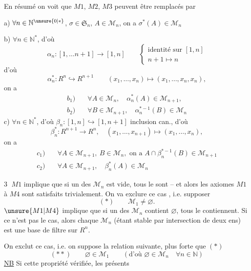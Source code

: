 En résumé on voit que $M1$, $M2$, $M3$ peuvent être remplacés par

a)  $\forall n\in\mathbb N^{\unsure{0|*}}$, $\sigma\in\mathfrak S_n$, $A\in\mathcal M_n$, on a $\sigma^*(A)\in\mathcal M_n$

b) $\forall n\in\mathbb N^*$, d'où
\[
\alpha_n:[1,\ldots n+1]\longrightarrow[1,n]\qquad
\left\{\begin{gathered}\text{identité sur }[1,n]\\ n+1\longmapsto n\end{gathered}\right.
\]
d'où 
\[
\alpha_n^*:R^n\hookrightarrow R^{n+1}\qquad(x_1,\ldots,x_n)\longmapsto(x_1,\ldots,x_n,x_n),
\]
on a
\[
\begin{aligned}
b_1)\quad&\forall A\in\mathcal M_n,\quad\alpha_n^*(A)\in\mathcal M_{n+1},\\
b_2)\quad&\forall B\in\mathcal M_{n+1},\quad\alpha_n^{*-1}(B)\in\mathcal M_n
\end{aligned}
\]
c) $\forall n\in\mathbb N^*$, d'où $\beta_n:[1,n]\hookrightarrow[1,n+1]$ inclusion can., d'où
\[
\beta_n^*:R^{n+1}\longrightarrow R^n,\quad(x_1,\ldots,x_{n+1})\longmapsto(x_1,\ldots,x_n),
\]
on a
\[
\begin{aligned}
c_1)\quad&\forall A\in\mathcal M_{n+1},\ B\in\mathcal M_n,\text{ on a }A\cap\beta_n^{*-1}(B)\in\mathcal M_{n+1}\\
c_2)\quad&\forall A\in\mathcal M_{n+1},\quad\beta_n^*(A)\in\mathcal M_n
\end{aligned}
\]

\textcircled{3} $M1$ implique que si un des $\mathcal M_n$ est vide, tous le sont -- et alors les axiomes $M1$ à $M4$ sont satisfaits trivialement. On va exclure ce cas , i.e. supposer
\[
(*)\qquad\mathcal M_1\ne\varnothing.
\]
$\unsure{M1|M4}$ implique que si un des $\mathcal M_n$ contient $\varnothing$, tous le contiennent. Si ce n'est pas le cas, alors chaque $\mathcal M_n$ (étant stable par intersection de deux ens) est une base de filtre sur $R^n$.

On exclut ce cas, i.e. on suppose la relation suivante, plus forte que $(*)$
\[
(**)\qquad\varnothing\in\mathcal M_1\qquad(\text{d'où }\varnothing\in\mathcal M_n\quad\forall n\in\mathbb N)
\]
\uline{NB} Si cette propriété  vérifiée, les présents
